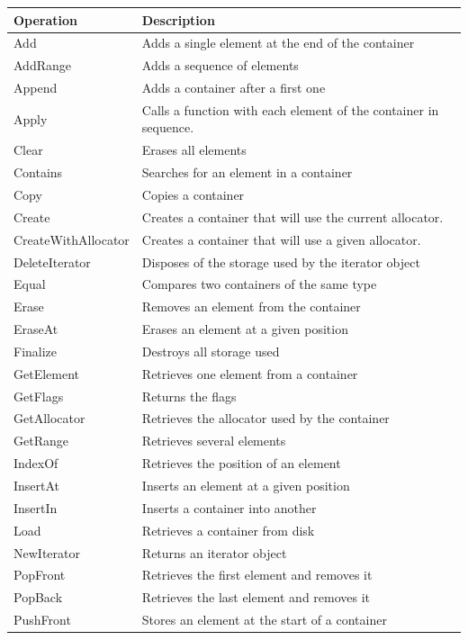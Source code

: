 \documentclass[12pt,a4paper]{memoir} %
\begin{document}
{\footnotesize
\begin{longtable}{|p{3.5cm}|p{10.5cm}|}
\hline
\textbf{Operation}&\textbf{Description}\\\hline 
Add&Adds a single element at the end of the container\\\hline
AddRange&Adds a sequence of elements\\\hline
Append&Adds a container after a first one \\\hline
Apply&Calls a function with each element of the container in  sequence.\\\hline
Clear&Erases all elements \\\hline
Contains&Searches for an element in a container\\\hline
Copy&Copies a container \\\hline
Create&Creates a container that will use the current allocator.\\\hline
CreateWithAllocator&Creates a container that will use a given allocator.\\\hline
DeleteIterator&Disposes of the storage used by the iterator object \\\hline
Equal&Compares two containers of the same type \\\hline
Erase&Removes an element from the container\\\hline
EraseAt&Erases an element at a given position \\\hline
Finalize&Destroys all storage used \\\hline 
GetElement&Retrieves one element from a container \\\hline
GetFlags&Returns the flags\\\hline
GetAllocator&Retrieves the allocator used by the container\\\hline
GetRange&Retrieves several elements\\\hline
IndexOf&Retrieves the position of an element \\\hline
InsertAt&Inserts an element at a given position \\\hline
InsertIn&Inserts a container into another \\\hline
Load&Retrieves a container from disk \\\hline
NewIterator&Returns an iterator object \\\hline
PopFront & Retrieves the first element and removes it\\\hline
PopBack& Retrieves the last element and removes it\\\hline
PushFront & Stores an element at the start of a container\\\hline

\end{longtable}}
\end{document}
